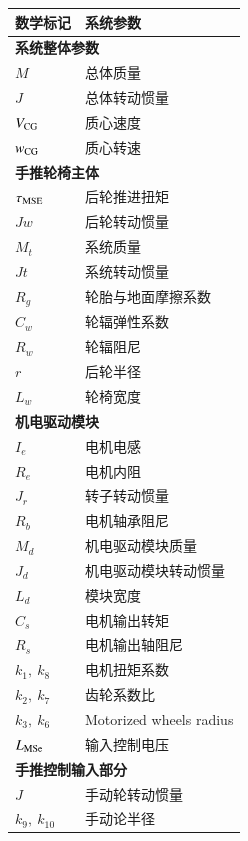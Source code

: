\begin{table}[H]
\caption{系统主要参数及其数学标记}\label{tab:param}
\begin{longtable}{l|l}
	\toprule
	\textbf{数学标记} & \textbf{系统参数}\\
	\midrule
	\endhead
	\multicolumn{2}{l}{\textbf{系统整体参数}} \\ %
	\midrule
	$ M $ & 总体质量\\
	$ J $ & 总体转动惯量\\
	$ V_{\rm{CG}} $ & 质心速度\\
	$ w_{\rm{CG}} $ & 质心转速\\
	\midrule
	\multicolumn{2}{l}{\textbf{手推轮椅主体}} \\
	\midrule
	$ \tau_{\rm{MSE}} $ & 后轮推进扭矩 \\
	$J w$ & 后轮转动惯量\\
	$ M_t $ & 系统质量\\
	$J t$ & 系统转动惯量\\
	$R_g$ & 轮胎与地面摩擦系数\\
	$ C_w $ & 轮辐弹性系数\\
	$R_w$ & 轮辐阻尼\\
	$ r $ & 后轮半径\\
	$ L_w $ & 轮椅宽度\\
	\midrule
	\multicolumn{2}{l}{\textbf{机电驱动模块}} \\
	\midrule
	$ I_e $ & 电机电感\\
	$ R_e $ & 电机内阻\\
	$ J_r $ & 转子转动惯量\\
	$ R_b $ & 电机轴承阻尼\\
	$ M_d $ & 机电驱动模块质量\\
	$ J_d $ & 机电驱动模块转动惯量\\
	$ L_d $ & 模块宽度\\
	$C_s $ & 电机输出转矩\\
	$ R_s $ & 电机输出轴阻尼\\
	$ k_1,\ k_8 $ & 电机扭矩系数\\
	$ k_2,\ k_7 $ & 齿轮系数比\\
	$ k_3,\ k_6 $ & {\color{blue}Motorized wheels radius} \\
	$ L_{\rm{MSe}} $ & 输入控制电压\\
	\midrule
	\multicolumn{2}{l}{\textbf{手推控制输入部分}}\\
	\midrule
	$ J $ & 手动轮转动惯量\\
	$ k_9,\ k_{10} $ & 手动论半径\\
	\bottomrule
\end{longtable}
\end{table}